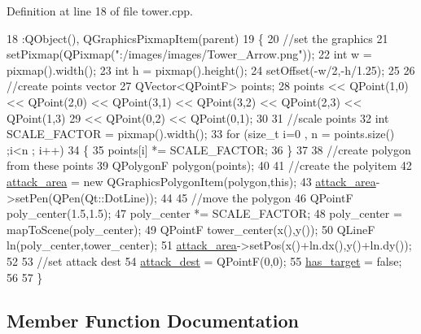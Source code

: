 Definition at line 18 of file tower.\+cpp.


\begin{DoxyCode}
18                                  :QObject(), QGraphicsPixmapItem(parent)
19 \{
20     \textcolor{comment}{//set the graphics}
21     setPixmap(QPixmap(\textcolor{stringliteral}{":/images/images/Tower\_Arrow.png"}));
22     \textcolor{keywordtype}{int} w = pixmap().width();
23     \textcolor{keywordtype}{int} h = pixmap().height();
24     setOffset(-w/2,-h/1.25);
25 
26     \textcolor{comment}{//create points vector}
27     QVector<QPointF> points;
28     points << QPoint(1,0) << QPoint(2,0) << QPoint(3,1) << QPoint(3,2) << QPoint(2,3) << QPoint(1,3)
29            << QPoint(0,2) << QPoint(0,1);
30 
31     \textcolor{comment}{//scale points}
32     \textcolor{keywordtype}{int} SCALE\_FACTOR = pixmap().width();
33     \textcolor{keywordflow}{for} (\textcolor{keywordtype}{size\_t} i=0 , n = points.size() ;i<n ; i++)
34     \{
35         points[i] *= SCALE\_FACTOR;
36     \}
37 
38     \textcolor{comment}{//create polygon from these points}
39     QPolygonF polygon(points);
40 
41     \textcolor{comment}{//create the polyitem}
42     \hyperlink{class_tower_a628af042db1aa134f2ab18b1f2b0eeb9}{attack\_area} = \textcolor{keyword}{new} QGraphicsPolygonItem(polygon,\textcolor{keyword}{this});
43     \hyperlink{class_tower_a628af042db1aa134f2ab18b1f2b0eeb9}{attack\_area}->setPen(QPen(Qt::DotLine));
44 
45     \textcolor{comment}{//move the polygon}
46     QPointF poly\_center(1.5,1.5);
47     poly\_center *= SCALE\_FACTOR;
48     poly\_center = mapToScene(poly\_center);
49     QPointF tower\_center(x(),y());
50     QLineF ln(poly\_center,tower\_center);
51     \hyperlink{class_tower_a628af042db1aa134f2ab18b1f2b0eeb9}{attack\_area}->setPos(x()+ln.dx(),y()+ln.dy());
52 
53     \textcolor{comment}{//set attack dest}
54     \hyperlink{class_tower_a2b3e8ab90ccceed1fa3a667db80c2c06}{attack\_dest} = QPointF(0,0);
55     \hyperlink{class_tower_a568b9b12bc604fb245a79476b71d6557}{has\_target} = \textcolor{keyword}{false};
56 
57 \}
\end{DoxyCode}


\subsection{Member Function Documentation}
\mbox{\label{class_tower_a6e0df1e43e746622967918aaf6f42dce}} 
